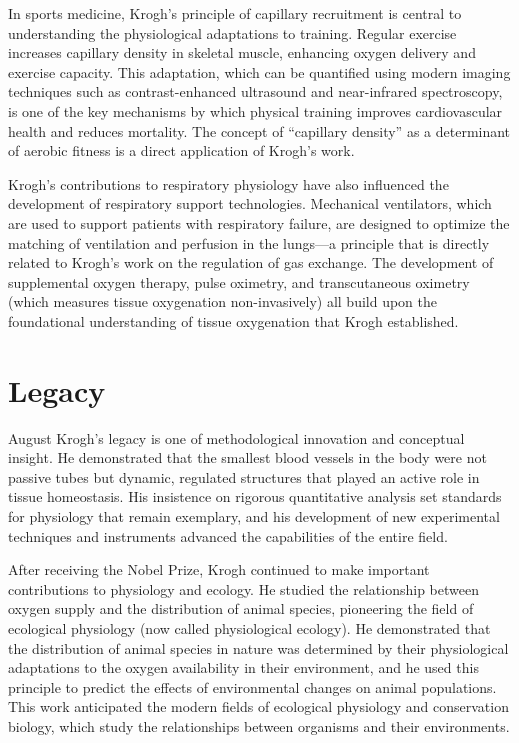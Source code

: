 In sports medicine, Krogh's principle of capillary recruitment is central to understanding the physiological adaptations to training. Regular exercise increases capillary density in skeletal muscle, enhancing oxygen delivery and exercise capacity. This adaptation, which can be quantified using modern imaging techniques such as contrast-enhanced ultrasound and near-infrared spectroscopy, is one of the key mechanisms by which physical training improves cardiovascular health and reduces mortality. The concept of ``capillary density'' as a determinant of aerobic fitness is a direct application of Krogh's work.

Krogh's contributions to respiratory physiology have also influenced the development of respiratory support technologies. Mechanical ventilators, which are used to support patients with respiratory failure, are designed to optimize the matching of ventilation and perfusion in the lungs---a principle that is directly related to Krogh's work on the regulation of gas exchange. The development of supplemental oxygen therapy, pulse oximetry, and transcutaneous oximetry (which measures tissue oxygenation non-invasively) all build upon the foundational understanding of tissue oxygenation that Krogh established.

\section{Legacy}

August Krogh's legacy is one of methodological innovation and conceptual insight. He demonstrated that the smallest blood vessels in the body were not passive tubes but dynamic, regulated structures that played an active role in tissue homeostasis. His insistence on rigorous quantitative analysis set standards for physiology that remain exemplary, and his development of new experimental techniques and instruments advanced the capabilities of the entire field.

After receiving the Nobel Prize, Krogh continued to make important contributions to physiology and ecology. He studied the relationship between oxygen supply and the distribution of animal species, pioneering the field of ecological physiology (now called physiological ecology). He demonstrated that the distribution of animal species in nature was determined by their physiological adaptations to the oxygen availability in their environment, and he used this principle to predict the effects of environmental changes on animal populations. This work anticipated the modern fields of ecological physiology and conservation biology, which study the relationships between organisms and their environments.

